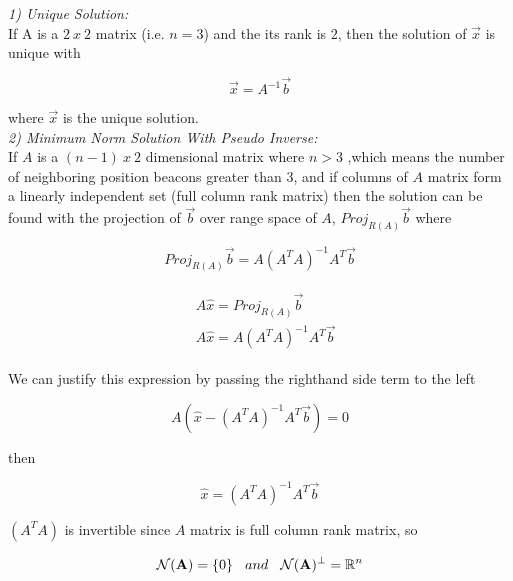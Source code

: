 \textit{1) Unique Solution:}\\
 If A is a $2\ x\ 2$ matrix (i.e. $n=3$) and the its rank is $2$, then the solution of $\vec{x}$ is unique with \cite{linear_ders_notu}

\begin{equation}
\vec{x} = A^{-1}\vec{b}
\end{equation}

where $\vec{x}$ is the unique solution. \\
  
\textit{ 2) Minimum Norm Solution With Pseudo Inverse:} \\  
If $A$ is a $(n-1)\ x\ 2$ dimensional matrix where $n>3$ ,which means the number of neighboring position beacons greater than $3$, and if columns of $A$ matrix form a linearly independent set (full column rank matrix) then the solution can be found with the projection of $\vec{b}$ over range space of $A$, $Proj_{R(A)}\vec{b}$ where \cite{linear_ders_notu}

\begin{equation}
Proj_{R(A)}\vec{b} = A (A^TA)^{-1}A^T\vec{b}
\end{equation}

\begin{align}
\begin{split}
& A\hat{x} = Proj_{R(A)}\vec{b}\\
& A\hat{x} = A(A^TA)^{-1}A^T\vec{b}
\end{split}
\end{align}
 
We can justify this expression by passing the righthand side term to the left

\begin{equation}
 A(\hat{x} - (A^TA)^{-1}A^T\vec{b}) = 0
\end{equation}

then 

\begin{equation}
\hat{x} = (A^TA)^{-1}A^T\vec{b}
\end{equation}
  
$(A^TA)$ is invertible since $A$ matrix is full column rank matrix, so 

\begin{align}
\begin{split}
\mathcal{N}(\mathbf{A}) = \{0\} \hspace{0.3cm}  and  \hspace{0.3cm}  \mathcal{N}(\mathbf{A})^\perp =\mathbb{R} ^n 
\end{split}
\end{align}
  
